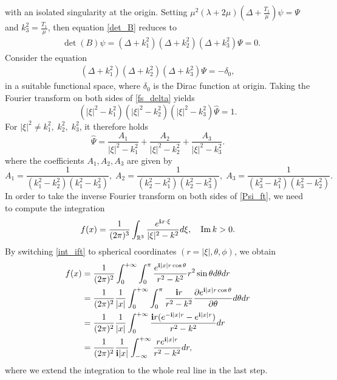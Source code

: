 \documentclass[11pt]{article}
\newcommand{\mat}{\mathbb}
\newcommand{\R}{{\mat R}}
\newcommand{\pa}{\partial}
\newcommand{\la}{\lambda}
\providecommand{\Ip}{\operatorname{Im}}%
\begin{document}
with an isolated singularity at the origin. Setting $\mu^2(\la+2\mu)(\Delta+\frac{T_1}{\mu})\psi=\Psi$ 
and $k_3^2=\frac{T_1}{\mu}$, then equation \eqref{det_B} reduces to
\begin{equation*}
\begin{aligned}
&\det(B)\psi=(\Delta+k_1^2)(\Delta+k_2^2)(\Delta+k_3^2)\Psi =0.
\end{aligned}
\end{equation*}
Consider the equation
\begin{equation}\label{fs_delta}
\begin{aligned}
(\Delta+k_1^2)(\Delta+k_2^2)(\Delta+k_3^2)\Psi = -\delta_0,
\end{aligned}
\end{equation}
in a suitable functional space, where $\delta_0$ is the Dirac function at origin.
Taking the Fourier transform on both sides of \eqref{fs_delta} yields
\begin{equation*}
(\lvert \xi \rvert^2-k_1^2)(\lvert \xi \rvert^2-k_2^2)(\lvert \xi \rvert^2-k_3^2)\hat{\Psi} =1.
\end{equation*}
For $\lvert \xi \rvert^2\neq k_1^2,\;k_2^2,\;k_3^2$, it therefore holds
\begin{equation}\label{Psi_ft}
\hat{\Psi} =\frac{A_1}{\lvert \xi \rvert^2-k_1^2}+\frac{A_2}{\lvert \xi \rvert^2-k_2^2}+
\frac{A_3}{\lvert \xi \rvert^2-k_3^2}.
\end{equation}
where the coefficients $A_1,A_2,A_3$ are given by 
\begin{equation}\label{A1A2A3}
A_1=\frac{1}{(k_1^2-k_2^2)(k_1^2-k_3^2)},\;A_2=\frac{1}{(k_2^2-k_1^2)(k_2^2-k_3^2)},
\;A_3=\frac{1}{(k_3^2-k_1^2)(k_3^2-k_2^2)}.
\end{equation}
In order to take the inverse Fourier transform on both sides of \eqref{Psi_ft}, we need to 
compute the integration
\begin{equation}\label{int_ift}
f(x)=\frac{1}{(2\pi)^3}\int_{ \R^3}\frac{e^{{\bf{i}}x\cdot \xi}}{\lvert \xi \rvert^2-k^2}d\xi,\quad \Ip k>0.
\end{equation}
By switching \eqref{int_ift} to spherical coordinates $(r=|\xi|,\theta,\phi)$, we obtain
\begin{equation}\label{integration_ift}
\begin{aligned}
f(x)&=\frac{1}{(2\pi)^2}\int_{0}^{+\infty}\int_{0}^{\pi}\frac{e^{{\bf{i}}\lvert x \rvert r \cos\theta}}
{r^2-k^2}r^2\sin\theta d\theta dr\\
&=\frac{1}{(2\pi)^2}\frac{1}{\lvert x \rvert}\int_{0}^{+\infty}\int_{0}^{\pi}\frac{{\bf{i}}r}{r^2-k^2}
\frac{\pa e^{{\bf{i}}\lvert x \rvert r\cos\theta}}{\pa \theta} d\theta dr\\
&=\frac{1}{(2\pi)^2}\frac{1}{\lvert x \rvert}\int_{0}^{+\infty}\frac{{\bf{i}}r(e^{-{\bf{i}}
\lvert x \rvert r}-e^{{\bf{i}}\lvert x \rvert r})}{r^2-k^2} dr\\
&=\frac{1}{(2\pi)^2}\frac{1}{{\bf{i}}|x|}\int_{-\infty}^{+\infty}\frac{r e^{{\bf{i}}|x|r}}{r^2-k^2}dr,
\end{aligned}
\end{equation}
where we extend the integration to the whole real line in the last step. 
\end{document}
